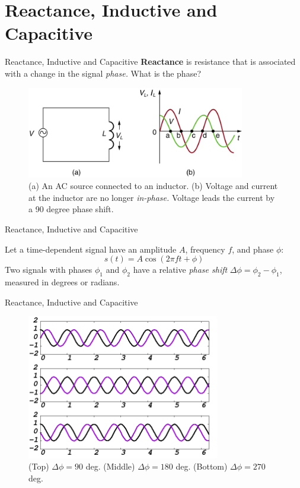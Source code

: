 \documentclass{beamer}
\begin{document}
\section{Reactance, Inductive and Capacitive}

\begin{frame}{Reactance, Inductive and Capacitive}
\small
\textbf{\alert{Reactance}} is resistance that is associated with a change in the signal \textit{phase.}  What is the phase?
\begin{figure}
\centering
\includegraphics[width=0.85\textwidth]{figures/phase.png}
\caption{\label{fig:phase} (a) An AC source connected to an inductor. (b) Voltage and current at the inductor are no longer \textit{in-phase.}  Voltage leads the current by a 90 degree phase shift.}
\end{figure}
\end{frame}

\begin{frame}{Reactance, Inductive and Capacitive}
\begin{tcolorbox}[colback=white,colframe=black!40!black,title=Phase Shift of a Sinusoid]
\alert{Let a time-dependent signal have an amplitude $A$, frequency $f$, and phase $\phi$:
\begin{equation}
s(t) = A\cos(2\pi f t + \phi)
\end{equation}
Two signals with phases $\phi_1$ and $\phi_2$ have a relative \textit{phase shift} $\Delta \phi = \phi_2 - \phi_1$, measured in degrees or radians.}
\end{tcolorbox}
\end{frame}

\begin{frame}{Reactance, Inductive and Capacitive}
\begin{figure}
\centering
\includegraphics[width=0.75\textwidth]{figures/phase2.png}
\caption{\label{fig:phase2} (Top) $\Delta\phi = 90$ deg. (Middle) $\Delta\phi = 180$ deg. (Bottom) $\Delta\phi = 270$ deg.}
\end{figure}
\end{frame}
\end{document}
